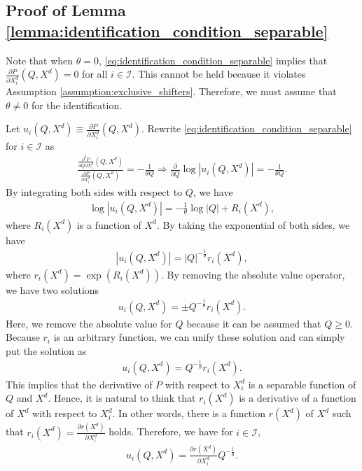 \documentclass[11pt, a4paper]{article}
\theoremstyle{remark}
\begin{document}
\subsection{Proof of Lemma \ref{lemma:identification_condition_separable}}

Note that when $\theta = 0$, \eqref{eq:identification_condition_separable} implies that $\frac{\partial P}{\partial X^{d}_i}(Q, X^{d}) = 0$ for all $i \in \mathcal{I}$.
This cannot be held because it violates Assumption \ref{assumption:exclusive_shifters}.
Therefore, we must assume that $\theta \ne 0$ for the identification.


Let $u_i(Q, X^{d}) \equiv \frac{\partial P}{\partial X^{d}_i}(Q, X^{d})$.
Rewrite \eqref{eq:identification_condition_separable} for $i \in \mathcal{I}$ as
\begin{align}
    \frac{\frac{\partial^2 P}{\partial Q\partial X^{d}_i}(Q, X^{d})}{ \frac{\partial P}{\partial X^{d}_i}(Q, X^{d}) } = - \frac{1}{\theta Q} \Longrightarrow \frac{\partial }{\partial Q}\log |u_i(Q, X^{d})| = -\frac{1}{\theta Q}.
\end{align}
By integrating both sides with respect to $Q$, we have
\begin{align}
    \log |u_i(Q, X^{d})| = -\frac{1}{\theta}\log |Q| + R_i(X^{d}),
\end{align}
where $R_i(X^{d})$ is a function of $X^{d}$.
By taking the exponential of both sides, we have
\begin{align}
    |u_i(Q, X^{d})| = |Q|^{-\frac{1}{\theta}}r_i(X^{d}),
\end{align}
where $r_i(X^{d})  = \exp(R_i(X^{d}))$.
By removing the absolute value operator, we have two solutions
\begin{align}
    u_i(Q, X^{d}) = \pm Q^{-\frac{1}{\theta}}r_i(X^{d}). 
\end{align}
Here, we remove the absolute value for $Q$ because it can be assumed that $Q\ge 0$.
Because $r_i$ is an arbitrary function, we can unify these solution and can simply put the solution as
\begin{align}
    u_i(Q, X^{d}) = Q^{-\frac{1}{\theta}}r_i(X^{d}). 
\end{align}
This implies that the derivative of $P$ with respect to $X^{d}_i$ is a separable function of $Q$ and $X^{d}$.
Hence, it is natural to think that $r_i(X^{d})$ is a derivative of a function of $X^{d}$ with respect to $X^{d}_i$.
In other words, there is a function $r(X^{d})$ of $X^{d}$ such that $r_i(X^{d}) = \frac{\partial r(X^{d})}{\partial X^{d}_i}$ holds.
Therefore, we have for $i \in \mathcal{I}$,
\begin{align}
    u_i(Q, X^{d}) = \frac{\partial r(X^{d})}{\partial X^{d}_i} Q^{-\frac{1}{\theta}}.
\end{align}
\end{document}
